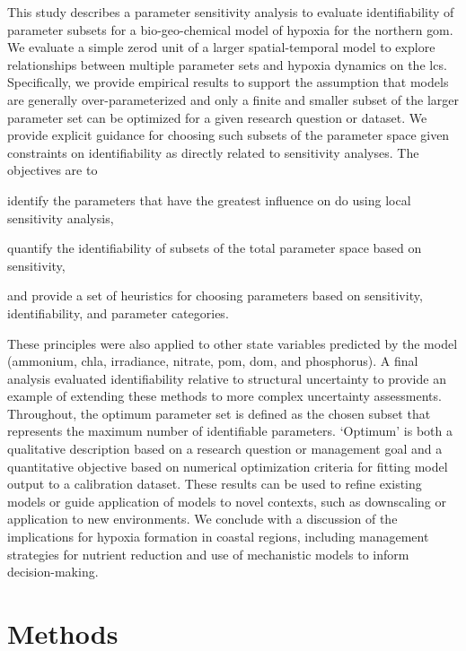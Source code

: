 \documentclass[letterpaper,12pt,oneside]{article}\usepackage[]{graphicx}\usepackage[]{color}
\begin{document}
This study describes a parameter sensitivity analysis to evaluate identifiability of parameter subsets for a bio-geo-chemical model of hypoxia for the northern \ac{gom}.  We evaluate a simple \ac{zerod} unit of a larger spatial-temporal model to explore relationships between multiple parameter sets and hypoxia dynamics on the \ac{lcs}.  Specifically, we provide empirical results to support the assumption that models are generally over-parameterized and only a finite and smaller subset of the larger parameter set can be optimized for a given research question or dataset.  We provide explicit guidance for choosing such subsets of the parameter space given constraints on identifiability as directly related to sensitivity analyses.  The objectives are to \begin{inparaenum}[1\upshape)]
\item identify the parameters that have the greatest influence on \ac{do} using local sensitivity analysis,
\item quantify the identifiability of subsets of the total parameter space based on sensitivity,
\item and provide a set of heuristics for choosing parameters based on sensitivity, identifiability, and parameter categories.
\end{inparaenum}
These principles were also applied to other state variables predicted by the model (ammonium, \ac{chla}, irradiance, nitrate, \ac{pom}, \ac{dom}, and phosphorus). A final analysis evaluated identifiability relative to structural uncertainty to provide an example of extending these methods to more complex uncertainty assessments.  Throughout, the optimum parameter set is defined as the chosen subset that represents the maximum number of identifiable parameters. `Optimum' is both a qualitative description based on a research question or management goal and a quantitative objective based on numerical optimization criteria for fitting model output to a calibration dataset.  These results can be used to refine existing models or guide application of models to novel contexts, such as downscaling or application to new environments.  We conclude with a discussion of the implications for hypoxia formation in coastal regions, including management strategies for nutrient reduction and use of mechanistic models to inform decision-making.

\section{Methods}
\end{document}
